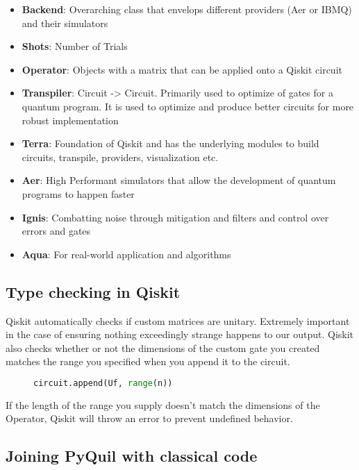 \documentclass[12pt]{article}
\begin{document}
\begin{itemize}
    \item \textbf{Backend}:  	Overarching class that envelops different providers (Aer or IBMQ) and their simulators
    \item \textbf{Shots}: 	Number of Trials
    \item \textbf{Operator}:	Objects with a matrix that can be applied onto a Qiskit circuit
    \item \textbf{Transpiler}:	Circuit -> Circuit. Primarily used to optimize of gates for a quantum program. It is used to optimize and produce better circuits for more robust implementation
    \item \textbf{Terra}:	Foundation of Qiskit and has the underlying modules to build circuits, transpile, providers, visualization etc.
    \item \textbf{Aer}:	High Performant simulators that allow the development of quantum programs to happen faster
    \item \textbf{Ignis}:	Combatting noise through mitigation and filters and control over errors and gates
    \item \textbf{Aqua}:	For real-world application and algorithms
\end{itemize}

\subsection{Type checking in Qiskit}

Qiskit automatically checks if custom matrices are unitary. Extremely important in the case of ensuring nothing exceedingly strange happens to our output. Qiskit also checks whether or not the dimensions of the custom gate you created matches the range you specified when you append it to the circuit.

\begin{figure}[h]
    \centering
    \begin{lstlisting}[numbers=none, language=Python]
    circuit.append(Uf, range(n))
\end{lstlisting}
\end{figure}

If the length of the range you supply doesn’t match the dimensions of the Operator, Qiskit will throw an error to prevent undefined behavior.

\subsection{Joining PyQuil with classical code}
\end{document}
